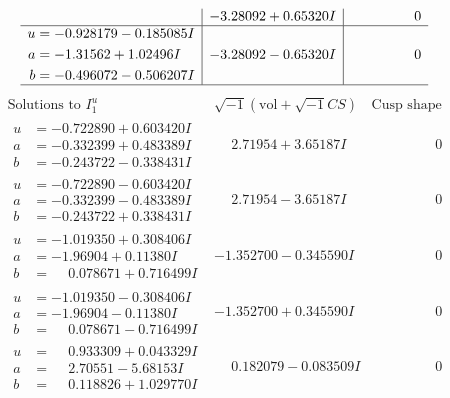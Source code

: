\documentclass[1p]{elsarticle_modified}
\theoremstyle{definition}
\newcommand{\I}{\sqrt{-1}}
\begin{document}
$$\begin{array}{c|c|c}
 & -3.28092 + 0.65320 I & \phantom{-0.000000 } 0 \\ \hline\begin{aligned}
u &= -0.928179 - 0.185085 I \\
a &= -1.31562 + 1.02496 I \\
b &= -0.496072 - 0.506207 I\end{aligned}
 & -3.28092 - 0.65320 I & \phantom{-0.000000 } 0\\
 \hline 
 \end{array}$$\newpage$$\begin{array}{c|c|c}  
\text{Solutions to }I^u_{1}& \I (\text{vol} + \sqrt{-1}CS) & \text{Cusp shape}\\
 \hline 
\begin{aligned}
u &= -0.722890 + 0.603420 I \\
a &= -0.332399 + 0.483389 I \\
b &= -0.243722 - 0.338431 I\end{aligned}
 & \phantom{-}2.71954 + 3.65187 I & \phantom{-0.000000 } 0 \\ \hline\begin{aligned}
u &= -0.722890 - 0.603420 I \\
a &= -0.332399 - 0.483389 I \\
b &= -0.243722 + 0.338431 I\end{aligned}
 & \phantom{-}2.71954 - 3.65187 I & \phantom{-0.000000 } 0 \\ \hline\begin{aligned}
u &= -1.019350 + 0.308406 I \\
a &= -1.96904 + 0.11380 I \\
b &= \phantom{-}0.078671 + 0.716499 I\end{aligned}
 & -1.352700 - 0.345590 I & \phantom{-0.000000 } 0 \\ \hline\begin{aligned}
u &= -1.019350 - 0.308406 I \\
a &= -1.96904 - 0.11380 I \\
b &= \phantom{-}0.078671 - 0.716499 I\end{aligned}
 & -1.352700 + 0.345590 I & \phantom{-0.000000 } 0 \\ \hline\begin{aligned}
u &= \phantom{-}0.933309 + 0.043329 I \\
a &= \phantom{-}2.70551 - 5.68153 I \\
b &= \phantom{-}0.118826 + 1.029770 I\end{aligned}
 & \phantom{-}0.182079 - 0.083509 I & \phantom{-0.000000 } 0 \\ \hline\begin{aligned}

\end{aligned}
\end{array}$$
\end{document}
